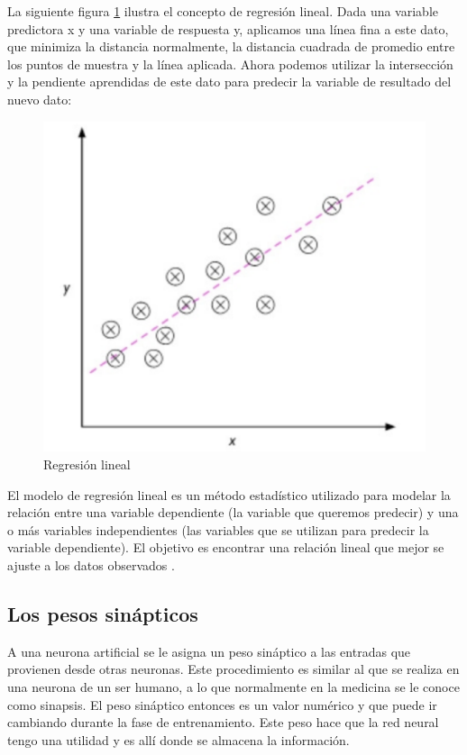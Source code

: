 La siguiente figura \ref{fig:red_recurreente} ilustra el concepto de regresión lineal. Dada una variable predictora x y una variable de respuesta y, aplicamos una línea fina a este dato, que minimiza la distancia normalmente, la distancia cuadrada de promedio entre los puntos de muestra y la línea aplicada. Ahora podemos utilizar la intersección y la pendiente aprendidas de este dato para predecir la variable de resultado del nuevo dato\cite{mirjalili2020python}:
\begin{figure}[H]
  \begin{center}
    \includegraphics[scale=0.40]{./grafico_regresion.png}
    \caption{Regresión lineal}
    \label{fig:red_recurreente}
  \end{center}
\end{figure}

El modelo de regresión lineal es un método estadístico utilizado para modelar la relación entre una variable dependiente (la variable que queremos predecir) y una o más variables independientes (las variables que se utilizan para predecir la variable dependiente). El objetivo es encontrar una relación lineal que mejor se ajuste a los datos observados \cite{sepulveda2023analisis}.

\subsection{Los pesos sinápticos}
A una neurona artificial se le asigna un peso sináptico a las entradas que provienen desde otras neuronas. Este procedimiento es similar al que se realiza en una neurona de un ser humano, a lo que normalmente en la medicina se le conoce como sinapsis. El peso sináptico entonces es un valor numérico y que puede ir cambiando durante la fase de entrenamiento\cite{acevedo2017principios}. Este peso hace que la red neural tengo una utilidad y es allí donde se almacena la información.

